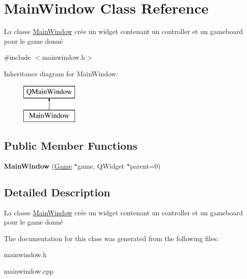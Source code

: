 \hypertarget{classMainWindow}{\section{Main\-Window Class Reference}
\label{classMainWindow}
}


La classe \hyperlink{classMainWindow}{Main\-Window} crée un widget contenant un controller et un gameboard pour le game donné  




{\ttfamily \#include $<$mainwindow.\-h$>$}

Inheritance diagram for Main\-Window\-:\begin{figure}[H]
\begin{center}
\leavevmode
\includegraphics[height=2.000000cm]{classMainWindow}
\end{center}
\end{figure}
\subsection*{Public Member Functions}
\begin{DoxyCompactItemize}
\item 
\hypertarget{classMainWindow_a05f5d27f2bb94feb0d223c68d3ac6774}{{\bfseries Main\-Window} (\hyperlink{classGame}{Game} $\ast$game, Q\-Widget $\ast$parent=0)}\label{classMainWindow_a05f5d27f2bb94feb0d223c68d3ac6774}

\end{DoxyCompactItemize}


\subsection{Detailed Description}
La classe \hyperlink{classMainWindow}{Main\-Window} crée un widget contenant un controller et un gameboard pour le game donné 

The documentation for this class was generated from the following files\-:\begin{DoxyCompactItemize}
\item 
mainwindow.\-h\item 
mainwindow.\-cpp\end{DoxyCompactItemize}
